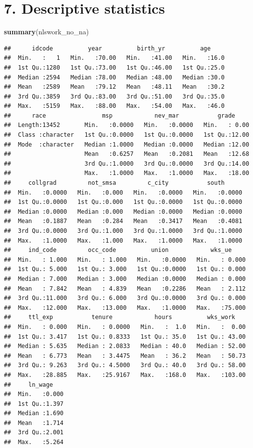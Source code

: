 \documentclass[
]{article}
\newenvironment{Shaded}{\begin{snugshade}}{\end{snugshade}}
\newcommand{\FunctionTok}[1]{\textcolor[rgb]{0.13,0.29,0.53}{\textbf{#1}}}
\newcommand{\NormalTok}[1]{#1}
\begin{document}
\hypertarget{descriptive-statistics}{%
\section{7. Descriptive statistics}\label{descriptive-statistics}}

\begin{Shaded}
\begin{Highlighting}[]
\FunctionTok{summary}\NormalTok{(nlswork\_no\_na) }
\end{Highlighting}
\end{Shaded}

\begin{verbatim}
##      idcode          year          birth_yr          age      
##  Min.   :   1   Min.   :70.00   Min.   :41.00   Min.   :16.0  
##  1st Qu.:1280   1st Qu.:73.00   1st Qu.:46.00   1st Qu.:25.0  
##  Median :2594   Median :78.00   Median :48.00   Median :30.0  
##  Mean   :2589   Mean   :79.12   Mean   :48.11   Mean   :30.2  
##  3rd Qu.:3859   3rd Qu.:83.00   3rd Qu.:51.00   3rd Qu.:35.0  
##  Max.   :5159   Max.   :88.00   Max.   :54.00   Max.   :46.0  
##      race                msp            nev_mar           grade      
##  Length:13452       Min.   :0.0000   Min.   :0.0000   Min.   : 0.00  
##  Class :character   1st Qu.:0.0000   1st Qu.:0.0000   1st Qu.:12.00  
##  Mode  :character   Median :1.0000   Median :0.0000   Median :12.00  
##                     Mean   :0.6257   Mean   :0.2081   Mean   :12.68  
##                     3rd Qu.:1.0000   3rd Qu.:0.0000   3rd Qu.:14.00  
##                     Max.   :1.0000   Max.   :1.0000   Max.   :18.00  
##     collgrad         not_smsa         c_city           south       
##  Min.   :0.0000   Min.   :0.000   Min.   :0.0000   Min.   :0.0000  
##  1st Qu.:0.0000   1st Qu.:0.000   1st Qu.:0.0000   1st Qu.:0.0000  
##  Median :0.0000   Median :0.000   Median :0.0000   Median :0.0000  
##  Mean   :0.1887   Mean   :0.284   Mean   :0.3417   Mean   :0.4081  
##  3rd Qu.:0.0000   3rd Qu.:1.000   3rd Qu.:1.0000   3rd Qu.:1.0000  
##  Max.   :1.0000   Max.   :1.000   Max.   :1.0000   Max.   :1.0000  
##     ind_code         occ_code          union            wks_ue      
##  Min.   : 1.000   Min.   : 1.000   Min.   :0.0000   Min.   : 0.000  
##  1st Qu.: 5.000   1st Qu.: 3.000   1st Qu.:0.0000   1st Qu.: 0.000  
##  Median : 7.000   Median : 3.000   Median :0.0000   Median : 0.000  
##  Mean   : 7.842   Mean   : 4.839   Mean   :0.2286   Mean   : 2.112  
##  3rd Qu.:11.000   3rd Qu.: 6.000   3rd Qu.:0.0000   3rd Qu.: 0.000  
##  Max.   :12.000   Max.   :13.000   Max.   :1.0000   Max.   :75.000  
##     ttl_exp           tenure            hours          wks_work     
##  Min.   : 0.000   Min.   : 0.0000   Min.   :  1.0   Min.   :  0.00  
##  1st Qu.: 3.417   1st Qu.: 0.8333   1st Qu.: 35.0   1st Qu.: 43.00  
##  Median : 5.635   Median : 2.0833   Median : 40.0   Median : 52.00  
##  Mean   : 6.773   Mean   : 3.4475   Mean   : 36.2   Mean   : 50.73  
##  3rd Qu.: 9.263   3rd Qu.: 4.5000   3rd Qu.: 40.0   3rd Qu.: 58.00  
##  Max.   :28.885   Max.   :25.9167   Max.   :168.0   Max.   :103.00  
##     ln_wage     
##  Min.   :0.000  
##  1st Qu.:1.397  
##  Median :1.690  
##  Mean   :1.714  
##  3rd Qu.:2.001  
##  Max.   :5.264
\end{verbatim}
\end{document}
